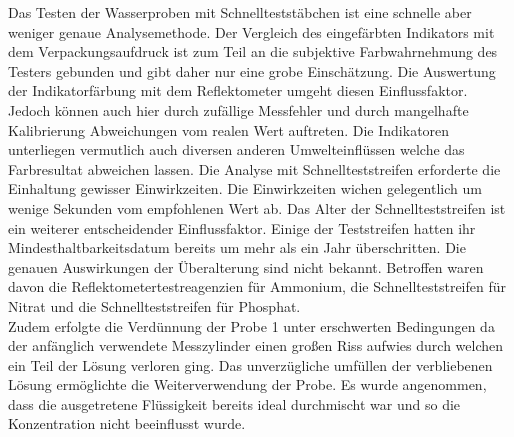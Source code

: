 Das Testen der Wasserproben mit Schnellteststäbchen ist eine schnelle aber weniger genaue Analysemethode. Der Vergleich des eingefärbten Indikators mit dem Verpackungsaufdruck ist zum Teil an die subjektive Farbwahrnehmung des Testers gebunden und gibt daher nur eine grobe Einschätzung. Die Auswertung der Indikatorfärbung mit dem Reflektometer umgeht diesen Einflussfaktor. Jedoch können auch hier durch zufällige Messfehler und durch mangelhafte Kalibrierung Abweichungen vom realen Wert auftreten. Die Indikatoren unterliegen vermutlich auch diversen anderen Umwelteinflüssen welche das Farbresultat abweichen lassen. %
Die Analyse mit Schnellteststreifen erforderte die Einhaltung gewisser Einwirkzeiten. Die Einwirkzeiten wichen gelegentlich um wenige Sekunden vom empfohlenen Wert ab.
\newpage
Das Alter der Schnellteststreifen ist ein weiterer entscheidender Einflussfaktor. Einige der Teststreifen hatten ihr Mindesthaltbarkeitsdatum bereits um mehr als ein Jahr überschritten. Die genauen Auswirkungen der Überalterung sind nicht bekannt.
Betroffen waren davon die Reflektometertestreagenzien für Ammonium, die Schnellteststreifen für Nitrat und die Schnellteststreifen für Phosphat.\\
Zudem erfolgte die Verdünnung der Probe 1 unter erschwerten Bedingungen da der anfänglich verwendete Messzylinder einen großen Riss aufwies durch welchen ein Teil der Lösung verloren ging. Das unverzügliche umfüllen der verbliebenen Lösung ermöglichte die Weiterverwendung der Probe. Es wurde angenommen, dass die ausgetretene Flüssigkeit bereits ideal durchmischt war und so die Konzentration nicht beeinflusst wurde.  

